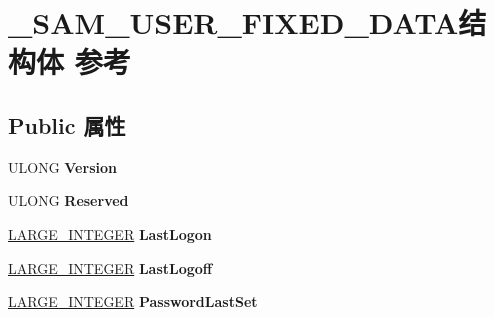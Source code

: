 \hypertarget{struct___s_a_m___u_s_e_r___f_i_x_e_d___d_a_t_a}{}\section{\+\_\+\+S\+A\+M\+\_\+\+U\+S\+E\+R\+\_\+\+F\+I\+X\+E\+D\+\_\+\+D\+A\+T\+A结构体 参考}
\label{struct___s_a_m___u_s_e_r___f_i_x_e_d___d_a_t_a}
\subsection*{Public 属性}
\begin{DoxyCompactItemize}
\item 
\mbox{\label{struct___s_a_m___u_s_e_r___f_i_x_e_d___d_a_t_a_a31eac6ae7a40aecb73fd4a6f591e554e}} 
U\+L\+O\+NG {\bfseries Version}
\item 
\mbox{\label{struct___s_a_m___u_s_e_r___f_i_x_e_d___d_a_t_a_aded3b4492a238d84065794eae4a1882c}} 
U\+L\+O\+NG {\bfseries Reserved}
\item 
\mbox{\label{struct___s_a_m___u_s_e_r___f_i_x_e_d___d_a_t_a_a0a3fc7168fb34e1a7cc11b775fdffad1}} 
\hyperlink{union___l_a_r_g_e___i_n_t_e_g_e_r}{L\+A\+R\+G\+E\+\_\+\+I\+N\+T\+E\+G\+ER} {\bfseries Last\+Logon}
\item 
\mbox{\label{struct___s_a_m___u_s_e_r___f_i_x_e_d___d_a_t_a_abef96a6d7a90b61d800562e6f59fc6da}} 
\hyperlink{union___l_a_r_g_e___i_n_t_e_g_e_r}{L\+A\+R\+G\+E\+\_\+\+I\+N\+T\+E\+G\+ER} {\bfseries Last\+Logoff}
\item 
\mbox{\label{struct___s_a_m___u_s_e_r___f_i_x_e_d___d_a_t_a_a4b7b0d1910d592ebf36d79ed4d523f7a}} 
\hyperlink{union___l_a_r_g_e___i_n_t_e_g_e_r}{L\+A\+R\+G\+E\+\_\+\+I\+N\+T\+E\+G\+ER} {\bfseries Password\+Last\+Set}
\item 
\mbox{\label{struct___s_a_m___u_s_e_r___f_i_x_e_d___d_a_t_a_a08bf5c41b4973ae78f16d080c72bbe04}} 

\end{DoxyCompactItemize}
